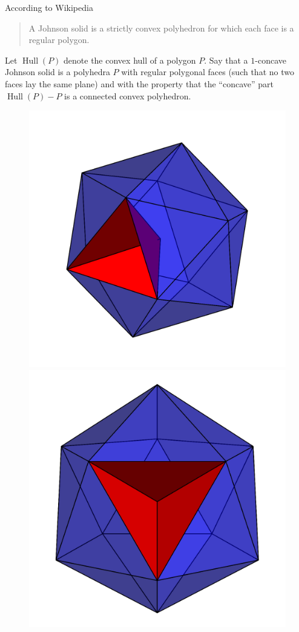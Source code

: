 \documentclass{article}
\begin{document}
According to Wikipedia
\begin{quote}
  A Johnson solid is a strictly convex polyhedron for which each face
  is a regular polygon.
\end{quote}
Let $\operatorname{Hull}(P)$ denote the convex hull of a polygon $P$.
Say that a $1$-concave Johnson solid is a polyhedra $P$ with regular polygonal
faces (such that no two faces lay the same plane) and with the property that the
``concave'' part $\operatorname{Hull}(P) - P$ is a connected convex polyhedron.

\begin{figure}[ht!]
  \centering
  \includegraphics[scale=0.18]{assets/114_problem/icosahedron-tetrahedron_side_view.png}
  \includegraphics[scale=0.18]{assets/114_problem/icosahedron-tetrahedron_top_view.png}

\end{figure}
\end{document}
